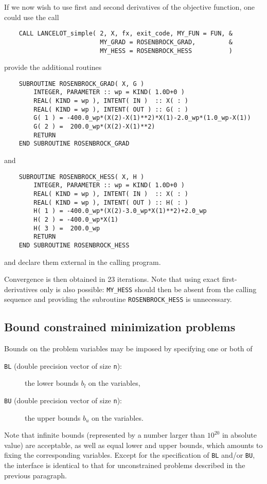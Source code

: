 \documentclass{article}
\begin{document}
If we now wish to use first and second derivatives of the objective
function, one could use the call
\begin{lstlisting}
    CALL LANCELOT_simple( 2, X, fx, exit_code, MY_FUN = FUN, &
                          MY_GRAD = ROSENBROCK_GRAD,         &
                          MY_HESS = ROSENBROCK_HESS          )
\end{lstlisting}
\noindent
provide the additional routines
\begin{lstlisting}
    SUBROUTINE ROSENBROCK_GRAD( X, G )
        INTEGER, PARAMETER :: wp = KIND( 1.0D+0 )
        REAL( KIND = wp ), INTENT( IN )  :: X( : )
        REAL( KIND = wp ), INTENT( OUT ) :: G( : )
        G( 1 ) = -400.0_wp*(X(2)-X(1)**2)*X(1)-2.0_wp*(1.0_wp-X(1))
        G( 2 ) =  200.0_wp*(X(2)-X(1)**2)
        RETURN
    END SUBROUTINE ROSENBROCK_GRAD
\end{lstlisting}
\noindent
and
\begin{lstlisting}
    SUBROUTINE ROSENBROCK_HESS( X, H )
        INTEGER, PARAMETER :: wp = KIND( 1.0D+0 )
        REAL( KIND = wp ), INTENT( IN )  :: X( : )
        REAL( KIND = wp ), INTENT( OUT ) :: H( : )
        H( 1 ) = -400.0_wp*(X(2)-3.0_wp*X(1)**2)+2.0_wp
        H( 2 ) = -400.0_wp*X(1)
        H( 3 ) =  200.0_wp
        RETURN
    END SUBROUTINE ROSENBROCK_HESS
\end{lstlisting}
\noindent
and declare them external in the calling program.

Convergence is then obtained in 23 iterations. Note that using exact
first-derivatives only is also possible: {\tt MY\_HESS} should then be absent
from the calling sequence and providing the subroutine {\tt ROSENBROCK\_HESS}
is unnecessary.

\subsection{Bound constrained minimization problems}

Bounds on the problem variables may be imposed by specifying one or
both of
\begin{description}
\item[{\tt BL} (double precision vector of size {\tt n}):]
the lower bounds $b_l$ on the variables,
\item[{\tt BU} (double precision vector of size {\tt n}):]
the upper bounds $b_u$ on the variables.
\end{description}
Note that infinite bounds (represented by a number larger than $10^{20}$
in absolute value) are acceptable, as well as equal lower and upper
bounds, which amounts to fixing the corresponding variables. Except for
the specification of {\tt BL} and/or {\tt BU}, the interface is identical to
that for unconstrained problems described in the previous paragraph.
\end{document}
